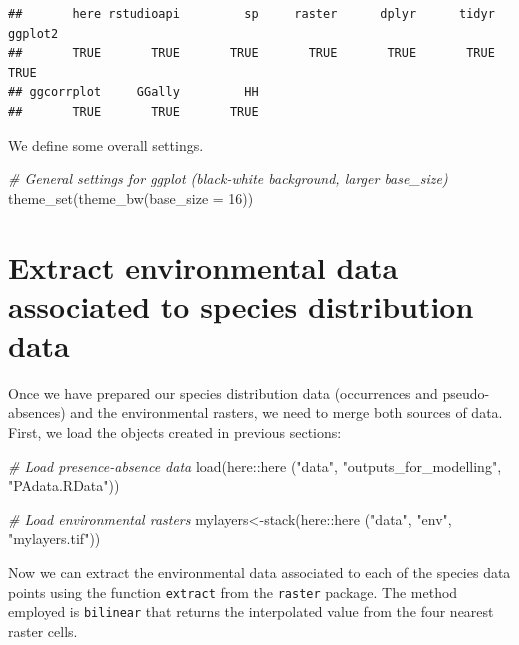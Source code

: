 \documentclass[
]{book}
\newenvironment{Shaded}{\begin{snugshade}}{\end{snugshade}}
\newcommand{\AttributeTok}[1]{\textcolor[rgb]{0.77,0.63,0.00}{#1}}
\newcommand{\CommentTok}[1]{\textcolor[rgb]{0.56,0.35,0.01}{\textit{#1}}}
\newcommand{\DecValTok}[1]{\textcolor[rgb]{0.00,0.00,0.81}{#1}}
\newcommand{\FunctionTok}[1]{\textcolor[rgb]{0.00,0.00,0.00}{#1}}
\newcommand{\NormalTok}[1]{#1}
\newcommand{\OtherTok}[1]{\textcolor[rgb]{0.56,0.35,0.01}{#1}}
\newcommand{\SpecialCharTok}[1]{\textcolor[rgb]{0.00,0.00,0.00}{#1}}
\newcommand{\StringTok}[1]{\textcolor[rgb]{0.31,0.60,0.02}{#1}}
\begin{document}
\begin{verbatim}
##       here rstudioapi         sp     raster      dplyr      tidyr    ggplot2 
##       TRUE       TRUE       TRUE       TRUE       TRUE       TRUE       TRUE 
## ggcorrplot     GGally         HH 
##       TRUE       TRUE       TRUE
\end{verbatim}

We define some overall settings.

\begin{Shaded}
\begin{Highlighting}[]
\CommentTok{\# General settings for ggplot (black{-}white background, larger base\_size)}
\FunctionTok{theme\_set}\NormalTok{(}\FunctionTok{theme\_bw}\NormalTok{(}\AttributeTok{base\_size =} \DecValTok{16}\NormalTok{))}
\end{Highlighting}
\end{Shaded}

\hypertarget{extract-environmental-data-associated-to-species-distribution-data}{%
\section{Extract environmental data associated to species distribution data}\label{extract-environmental-data-associated-to-species-distribution-data}}

Once we have prepared our species distribution data (occurrences and pseudo-absences) and the environmental rasters, we need to merge both sources of data. First, we load the objects created in previous sections:

\begin{Shaded}
\begin{Highlighting}[]
\CommentTok{\# Load presence{-}absence data}
\FunctionTok{load}\NormalTok{(here}\SpecialCharTok{::}\FunctionTok{here}\NormalTok{ (}\StringTok{"data"}\NormalTok{, }\StringTok{"outputs\_for\_modelling"}\NormalTok{, }\StringTok{"PAdata.RData"}\NormalTok{))}

\CommentTok{\# Load environmental rasters}
\NormalTok{mylayers}\OtherTok{\textless{}{-}}\FunctionTok{stack}\NormalTok{(here}\SpecialCharTok{::}\FunctionTok{here}\NormalTok{ (}\StringTok{"data"}\NormalTok{, }\StringTok{"env"}\NormalTok{, }\StringTok{"mylayers.tif"}\NormalTok{))}
\end{Highlighting}
\end{Shaded}

Now we can extract the environmental data associated to each of the species data points using the function \texttt{extract} from the \texttt{raster} package. The method employed is \texttt{bilinear} that returns the interpolated value from the four nearest raster cells.
\end{document}

